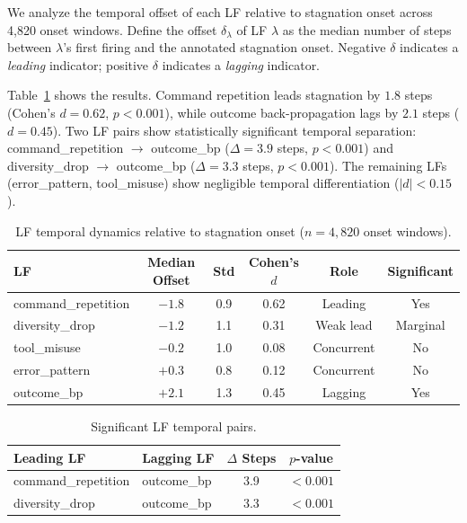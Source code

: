 \documentclass[11pt]{article}
\begin{document}
We analyze the temporal offset of each LF relative to stagnation onset across 4,820 onset windows.
Define the offset $\delta_\lambda$ of LF $\lambda$ as the median number of steps between $\lambda$'s first firing and the annotated stagnation onset.
Negative $\delta$ indicates a \emph{leading} indicator; positive $\delta$ indicates a \emph{lagging} indicator.

Table~\ref{tab:temporal_dynamics} shows the results.
Command repetition leads stagnation by $1.8$ steps (Cohen's $d = 0.62$, $p < 0.001$), while outcome back-propagation lags by $2.1$ steps ($d = 0.45$).
Two LF pairs show statistically significant temporal separation: command\_repetition $\rightarrow$ outcome\_bp ($\Delta = 3.9$ steps, $p < 0.001$) and diversity\_drop $\rightarrow$ outcome\_bp ($\Delta = 3.3$ steps, $p < 0.001$).
The remaining LFs (error\_pattern, tool\_misuse) show negligible temporal differentiation ($|d| < 0.15$).

\begin{table}[t]
\centering
\caption{LF temporal dynamics relative to stagnation onset ($n = 4{,}820$ onset windows).}
\label{tab:temporal_dynamics}
\small
\begin{tabular}{lccccc}
\toprule
LF & Median Offset & Std & Cohen's $d$ & Role & Significant \\
\midrule
command\_repetition & $-1.8$ & 0.9 & 0.62 & Leading & Yes \\
diversity\_drop & $-1.2$ & 1.1 & 0.31 & Weak lead & Marginal \\
tool\_misuse & $-0.2$ & 1.0 & 0.08 & Concurrent & No \\
error\_pattern & $+0.3$ & 0.8 & 0.12 & Concurrent & No \\
outcome\_bp & $+2.1$ & 1.3 & 0.45 & Lagging & Yes \\
\bottomrule
\end{tabular}
\end{table}

\begin{table}[t]
\centering
\caption{Significant LF temporal pairs.}
\label{tab:temporal_pairs}
\small
\begin{tabular}{llcc}
\toprule
Leading LF & Lagging LF & $\Delta$ Steps & $p$-value \\
\midrule
command\_repetition & outcome\_bp & 3.9 & $<0.001$ \\
diversity\_drop & outcome\_bp & 3.3 & $<0.001$ \\
\bottomrule
\end{tabular}
\end{table}
\end{document}
